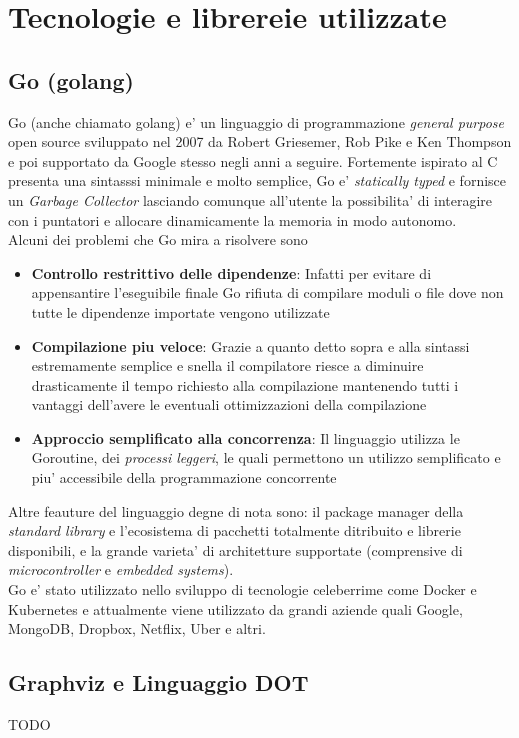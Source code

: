\chapter{Tecnologie e librereie utilizzate}
\section{Go (golang)}
Go (anche chiamato {golang}) e' un linguaggio di programmazione \emph{general purpose} open source sviluppato nel 2007 da Robert Griesemer, Rob Pike e Ken Thompson e poi supportato da Google stesso negli anni a seguire. Fortemente ispirato al C presenta una sintasssi minimale e molto semplice, Go e' \emph{statically typed} e fornisce un \emph{Garbage Collector} lasciando comunque all'utente la possibilita' di interagire con i puntatori e allocare dinamicamente la memoria in modo autonomo.\\
Alcuni dei problemi che Go mira a risolvere sono
\begin{itemize}
    \item \textbf{Controllo restrittivo delle dipendenze}: Infatti per evitare di appensantire l'eseguibile finale Go rifiuta di compilare moduli o file dove non tutte le dipendenze importate vengono utilizzate
    \item \textbf{Compilazione piu veloce}: Grazie a quanto detto sopra e alla sintassi estremamente semplice e snella il compilatore riesce a diminuire drasticamente il tempo richiesto alla compilazione mantenendo tutti i vantaggi dell'avere le eventuali ottimizzazioni della compilazione
    \item \textbf{Approccio semplificato alla concorrenza}: Il linguaggio utilizza le Goroutine, dei \emph{processi leggeri}, le quali permettono un utilizzo semplificato e piu' accessibile della programmazione concorrente
\end{itemize}
Altre feauture del linguaggio degne di nota sono: il package manager della \emph{standard library} e l'ecosistema di pacchetti totalmente ditribuito e librerie disponibili, e la grande varieta' di architetture supportate (comprensive di \emph{microcontroller} e \emph{embedded systems}).\\
Go e' stato utilizzato nello sviluppo di tecnologie celeberrime come Docker e Kubernetes e attualmente viene utilizzato da grandi aziende quali Google, MongoDB, Dropbox, Netflix, Uber e altri.

\section{Graphviz e Linguaggio DOT}
TODO